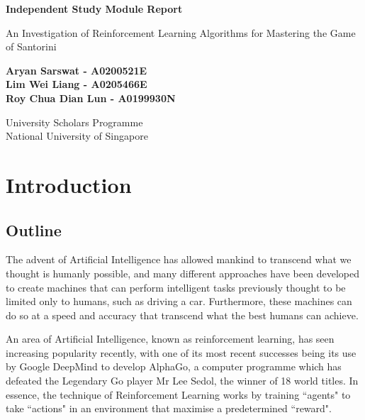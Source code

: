 \documentclass[a4paper,12pt,table]{article}
\begin{document}
\begin{titlepage}
   \begin{center}
       \vspace*{6cm}

       \textbf{{\Huge Independent Study Module Report}}

	\vspace{5cm}

 {\Large An Investigation of Reinforcement Learning Algorithms for Mastering the Game of Santorini}

       \vspace{0.5cm}

       \vspace{1.5cm}


       \vfill



       \textbf{Aryan Sarswat -  A0200521E \\
		Lim Wei Liang - A0205466E \\
		Roy Chua Dian Lun - A0199930N \\ }

       \vspace{0.8cm}

      University Scholars Programme\\
       National University of Singapore\\

   \end{center}
\end{titlepage}


\tableofcontents
\newpage


\section{Introduction}

\subsection{Outline}

The advent of Artificial Intelligence has allowed mankind to transcend what we thought is humanly possible, and many different approaches have been developed to create machines that can perform intelligent tasks previously thought to be limited only to humans, such as driving a car. Furthermore, these machines can do so at a speed and accuracy that transcend what the best humans can achieve. \par

An area of Artificial Intelligence, known as reinforcement learning, has seen increasing popularity recently, with one of its most recent successes being its use by Google DeepMind to develop AlphaGo, a computer programme which has defeated the Legendary Go player Mr Lee Sedol, the winner of 18 world titles. In essence, the technique of Reinforcement Learning works by training “agents" to take “actions" in an environment that maximise a predetermined “reward".
\end{document}
